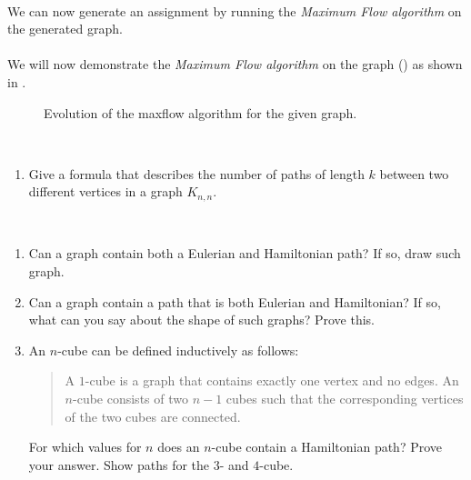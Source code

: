 \documentclass{article}
\begin{document}
\begin{exercise}
\begin{answer}
\paragraph{}
We can now generate an assignment by running the \emph{Maximum Flow algorithm} on the generated graph.
\paragraph{}
We will now demonstrate the \emph{Maximum Flow algorithm} on the graph () as shown in .
\begin{figure}
\caption{Evolution of the maxflow algorithm for the given graph.}
\end{figure}
\end{answer}
\end{exercise}
\begin{exercise}~~
\begin{enumerate}
 \item Give a formula that describes the number of paths of length $k$ between two different vertices in a graph $K_{n,n}$.
\end{enumerate}

\end{exercise}
\begin{exercise}~~
\begin{enumerate}
 \item Can a graph contain both a Eulerian and Hamiltonian path? If so, draw such graph.
 \item Can a graph contain a path that is both Eulerian and Hamiltonian? If so, what can you say about the shape of such graphs? Prove this.
 \item An $n$-cube can be defined inductively as follows:
 \begin{quote}
  \begin{definition}[$n$-cube]
   A $1$-cube is a graph that contains exactly one vertex and no edges. An $n$-cube consists of two $n-1$ cubes such that the corresponding vertices of the two cubes are connected.
  \end{definition}
 \end{quote}
 For which values for $n$ does an $n$-cube contain a Hamiltonian path? Prove your answer. Show paths for the $3$- and $4$-cube.
\end{enumerate}
\end{exercise}
\end{document}
